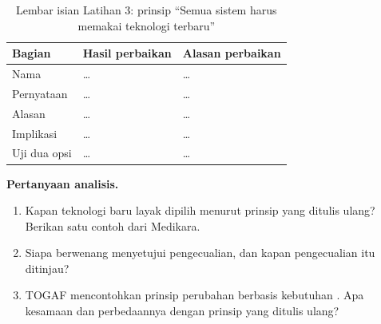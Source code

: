 \begin{table}[!htb]
  \centering
  \caption{Lembar isian Latihan 3: prinsip ``Semua sistem harus memakai teknologi terbaru''}
  \label{tab:ch03-lat3-hasil}
  \footnotesize
  \begin{tabularx}{\textwidth}{>{\raggedright\arraybackslash}p{1.7cm}>{\raggedright\arraybackslash}X>{\raggedright\arraybackslash}p{3.6cm}}
    \hline
    \textbf{Bagian} & \textbf{Hasil perbaikan} & \textbf{Alasan perbaikan} \\
    \hline
    Nama & \dots & \dots \\
    \hline
    Pernyataan & \dots & \dots \\
    \hline
    Alasan & \dots & \dots \\
    \hline
    Implikasi & \dots & \dots \\
    \hline
    Uji dua opsi & \dots & \dots \\
    \hline
  \end{tabularx}
\end{table}

\textbf{Pertanyaan analisis.}

\begin{enumerate}
  \item Kapan teknologi baru layak dipilih menurut prinsip yang ditulis ulang? Berikan satu contoh
        dari Medikara.
  \item Siapa berwenang menyetujui pengecualian, dan kapan pengecualian itu ditinjau?
  \item TOGAF mencontohkan prinsip perubahan berbasis kebutuhan \cite{togaf10}. Apa kesamaan dan
        perbedaannya dengan prinsip yang ditulis ulang?
\end{enumerate}
